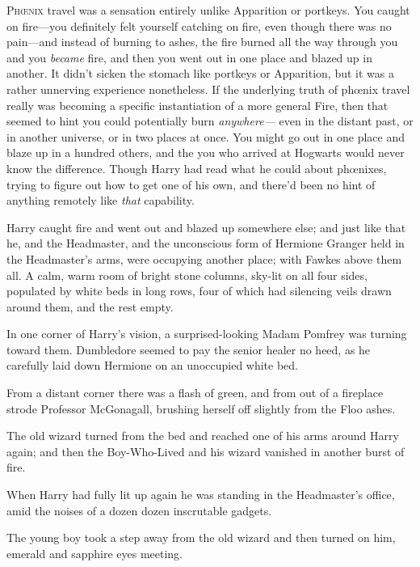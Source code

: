
\lettrine{P}{hœnix} travel was a sensation entirely unlike Apparition or portkeys. You caught on fire—you definitely felt yourself catching on fire, even though there was no pain—and instead of burning to ashes, the fire burned all the way through you and you \emph{became} fire, and then you went out in one place and blazed up in another. It didn’t sicken the stomach like portkeys or Apparition, but it was a rather unnerving experience nonetheless. If the underlying truth of phœnix travel really was becoming a specific instantiation of a more general Fire, then that seemed to hint you could potentially burn \emph{anywhere—} even in the distant past, or in another universe, or in two places at once. You might go out in one place and blaze up in a hundred others, and the you who arrived at Hogwarts would never know the difference. Though Harry had read what he could about phœnixes, trying to figure out how to get one of his own, and there’d been no hint of anything remotely like \emph{that} capability.

Harry caught fire and went out and blazed up somewhere else; and just like that he, and the Headmaster, and the unconscious form of Hermione Granger held in the Headmaster’s arms, were occupying another place; with Fawkes above them all. A calm, warm room of bright stone columns, sky-lit on all four sides, populated by white beds in long rows, four of which had silencing veils drawn around them, and the rest empty.

In one corner of Harry’s vision, a surprised-looking Madam Pomfrey was turning toward them. Dumbledore seemed to pay the senior healer no heed, as he carefully laid down Hermione on an unoccupied white bed.

From a distant corner there was a flash of green, and from out of a fireplace strode Professor McGonagall, brushing herself off slightly from the Floo ashes.

The old wizard turned from the bed and reached one of his arms around Harry again; and then the Boy-Who-Lived and his wizard vanished in another burst of fire.

\later

When Harry had fully lit up again he was standing in the Headmaster’s office, amid the noises of a dozen dozen inscrutable gadgets.

The young boy took a step away from the old wizard and then turned on him, emerald and sapphire eyes meeting.

